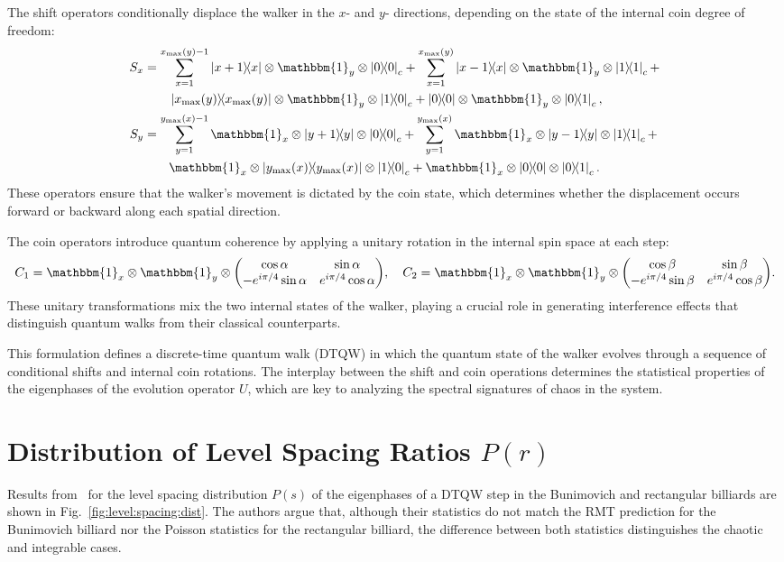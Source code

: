 \documentclass[10pt,letterpaper]{article} %
\newcommand{\one}{\mathbbm{1}}
\begin{document}
The shift operators conditionally displace the walker in the \( x \)- and \( y \)- 
directions, depending on the state of the internal coin degree of freedom:
\begin{align}
    S_x &= 
    \sum_{x=1}^{x_{\max}(y)-1} \dyad{x+1}{x}\otimes \one_y \otimes \dyad{0}_c +
    \sum_{x=1}^{x_{\max}(y)} \dyad{x-1}{x}\otimes \one_y  \otimes \dyad{1}_c + \\
    &\qquad  \dyad{x_{\max}(y)}\otimes \one_y \otimes \dyad{1}{0}_c + 
    \dyad{0}\otimes \one_y \otimes \dyad{0}{1}_c, \\
    S_y &= 
    \sum_{y=1}^{y_{\max}(x)-1} \one_x \otimes \dyad{y+1}{y}\otimes \dyad{0}_c +
    \sum_{y=1}^{y_{\max}(x)} \one_x \otimes \dyad{y-1}{y}\otimes \dyad{1}_c + \\
    &\qquad 
    \one_x \otimes \dyad{y_{\max}(x)}\otimes \dyad{1}{0}_c + 
    \one_x \otimes \dyad{0}\otimes \dyad{0}{1}_c.
\end{align}
These operators ensure that the walker's movement is dictated by the coin state, 
which determines whether the displacement occurs forward or backward along each 
spatial direction.

The coin operators introduce quantum coherence by applying a unitary rotation in 
the internal spin space at each step:
\begin{equation}
    C_1 = \one_x \otimes \one_y \otimes 
    \mqty(\cos\alpha & \sin\alpha \\ -e^{i\pi/4}\sin\alpha & e^{i\pi/4}\cos\alpha),
    \quad 
    C_2 = \one_x \otimes \one_y \otimes 
    \mqty(\cos\beta & \sin\beta \\ -e^{i\pi/4}\sin\beta & e^{i\pi/4}\cos\beta).
\end{equation}
These unitary transformations mix the two internal states of the walker, playing 
a crucial role in generating interference effects that distinguish quantum walks 
from their classical counterparts.

This formulation defines a discrete-time quantum walk (DTQW) in which the quantum 
state of the walker evolves through a sequence of conditional shifts and internal 
coin rotations. The interplay between the shift and coin operations determines 
the statistical properties of the eigenphases of the evolution operator \( U \), 
which are key to analyzing the spectral signatures of chaos in the system.

\section{Distribution of Level Spacing Ratios $P(r)$}
Results from~\cite{alonso-lobo_2025_simplest} for the level spacing distribution 
$P(s)$ of the eigenphases of a DTQW step in the Bunimovich and rectangular 
billiards are shown in Fig.~\ref{fig:level:spacing:dist}. The authors argue that, 
although their statistics do not match the RMT prediction for the Bunimovich 
billiard nor the Poisson statistics for the rectangular billiard, the difference 
between both statistics distinguishes the chaotic and integrable cases.
\end{document}

